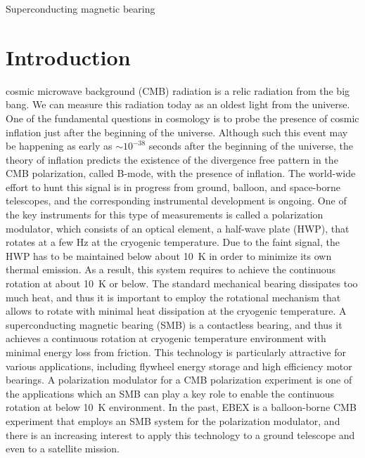 \documentclass[journal]{IEEEtran}
\begin{document}
\begin{IEEEkeywords}
Superconducting magnetic bearing
\end{IEEEkeywords}

%
\IEEEpeerreviewmaketitle


\section{Introduction}
 cosmic microwave background (CMB) radiation is a relic radiation from the big bang.
We can measure this radiation today as an oldest light from the universe.
One of the fundamental questions in cosmology is to probe the presence of cosmic inflation just after the beginning of the universe.
Although such this event may be happening as early as $\sim10^{-38}$ seconds after the beginning of the universe, the theory of inflation predicts the existence of the divergence free pattern in the CMB polarization, called B-mode, with the presence of inflation.
The world-wide effort to hunt this signal is in progress from ground, balloon, and space-borne telescopes, and the corresponding instrumental development is ongoing.
One of the key instruments for this type of measurements is called a polarization modulator, which consists of an optical element, a half-wave plate (HWP), that rotates at a few Hz at the cryogenic temperature.
Due to the faint signal, the HWP has to be maintained below about 10~K in order to minimize its own thermal emission.
As a result, this system requires to achieve the continuous rotation at about 10~K or below.
The standard mechanical bearing dissipates too much heat, and thus it is important to employ the rotational mechanism that allows to rotate with minimal heat dissipation at the cryogenic temperature.
A superconducting magnetic bearing (SMB) is a contactless bearing, and thus it achieves a continuous rotation at cryogenic temperature environment with minimal energy loss from friction.
This technology is particularly attractive for various applications, including flywheel energy storage and high efficiency motor bearings.
A polarization modulator for a CMB polarization experiment is one of the applications which an SMB can play a key role to enable the continuous rotation at below 10~K environment.
In the past, EBEX is a balloon-borne CMB experiment that employs an SMB system for the polarization modulator, and there is an increasing interest to apply this technology to a ground telescope and even to a satellite mission\cite{jklein}.
\end{document}
